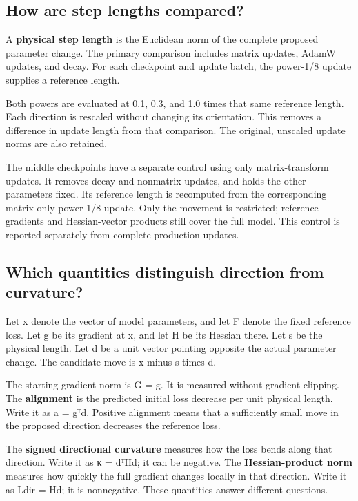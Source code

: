 \documentclass[
  14pt,
  letterpaper,
]{extarticle}
\begin{document}
\subsection{How are step lengths
compared?}\label{how-are-step-lengths-compared}

A \textbf{physical step length} is the Euclidean norm of the complete
proposed parameter change. The primary comparison includes matrix
updates, AdamW updates, and decay. For each checkpoint and update batch,
the power-1/8 update supplies a reference length.

Both powers are evaluated at 0.1, 0.3, and 1.0 times that same reference
length. Each direction is rescaled without changing its orientation.
This removes a difference in update length from that comparison. The
original, unscaled update norms are also retained.

The middle checkpoints have a separate control using only
matrix-transform updates. It removes decay and nonmatrix updates, and
holds the other parameters fixed. Its reference length is recomputed
from the corresponding matrix-only power-1/8 update. Only the movement
is restricted; reference gradients and Hessian-vector products still
cover the full model. This control is reported separately from complete
production updates.

\subsection{Which quantities distinguish
direction from curvature?}\label{which-quantities-distinguish-direction-from-curvature}

Let x denote the vector of model parameters, and let F denote the fixed
reference loss. Let g be its gradient at x, and let H be its Hessian
there. Let s be the physical length. Let d be a unit vector pointing
opposite the actual parameter change. The candidate move is x minus s
times d.

The starting gradient norm is G = \textbar\textbar g\textbar\textbar. It
is measured without gradient clipping. The \textbf{alignment} is the
predicted initial loss decrease per unit physical length. Write it as a
= gᵀd. Positive alignment means that a sufficiently small move in the
proposed direction decreases the reference loss.

The \textbf{signed directional curvature} measures how the loss bends
along that direction. Write it as κ = dᵀHd; it can be negative. The
\textbf{Hessian-product norm} measures how quickly the full gradient
changes locally in that direction. Write it as Ldir =
\textbar\textbar Hd\textbar\textbar; it is nonnegative. These quantities
answer different questions.
\end{document}

